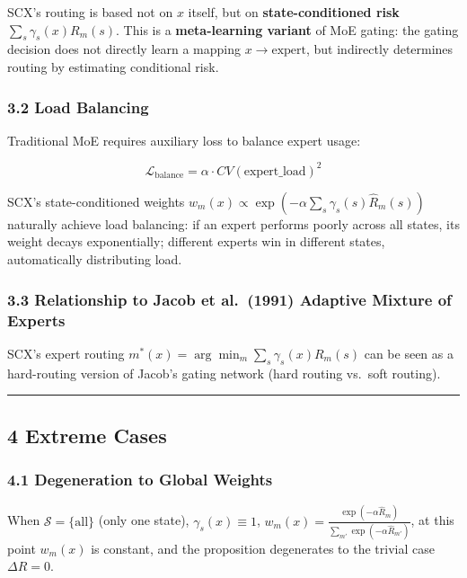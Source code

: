 \documentclass[
  12pt,
]{article}
\begin{document}
SCX's routing is based not on \(x\) itself, but on \textbf{state-conditioned risk}
\(\sum_s \gamma_s(x) R_m(s)\). This is a \textbf{meta-learning variant} of MoE
gating: the gating decision does not directly learn
a mapping \(x \to \text{expert}\), but indirectly determines routing by estimating conditional risk.

\subsubsection{3.2 Load Balancing}\label{load-balancing}

Traditional MoE requires auxiliary loss to balance expert usage:

\[\mathcal{L}_{\text{balance}} = \alpha \cdot CV(\text{expert\_load})^2\]

SCX's state-conditioned weights
\(w_m(x) \propto \exp(-\alpha \sum_s \gamma_s(s) \hat{R}_m(s))\)
naturally achieve load balancing: if an expert performs poorly across all states, its weight decays exponentially; different experts win in different states, automatically distributing load.

\subsubsection{3.3 Relationship to Jacob et al.~(1991) Adaptive Mixture of Experts}\label{relation-jacob}

SCX's expert routing \(m^*(x) = \arg\min_m \sum_s \gamma_s(x) R_m(s)\)
can be seen as a hard-routing version of Jacob's gating network (hard routing vs.~soft routing).

\begin{center}\rule{0.5\linewidth}{0.5pt}\end{center}

\subsection{4 Extreme Cases}\label{extreme-cases}

\subsubsection{4.1 Degeneration to Global Weights}\label{degeneration-global}

When
\(\mathcal{S} = \{\text{all}\}\) (only one state), \(\gamma_s(x) \equiv 1\), \(w_m(x) = \frac{\exp(-\alpha \hat{R}_m)}{\sum_{m'} \exp(-\alpha \hat{R}_{m'})}\), at this point
\(w_m(x)\) is constant, and the proposition degenerates to the trivial case \(\Delta R = 0\).
\end{document}

